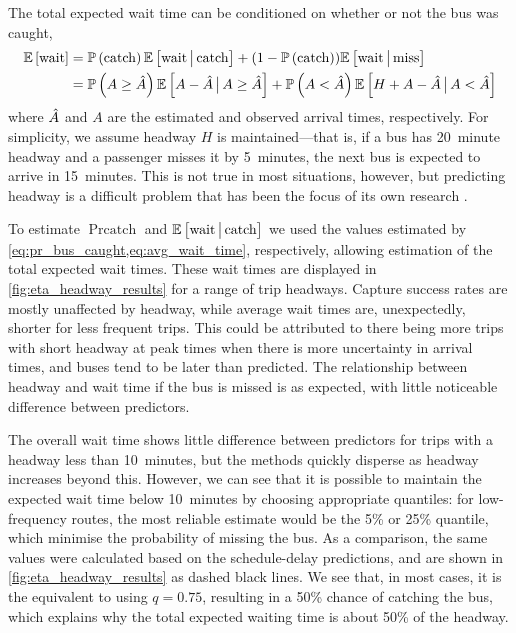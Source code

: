 The total expected wait time can be conditioned on whether or not the bus was caught,
\begin{equation}
\label{eq:eta_wait_conditional}
\begin{split}
\mathbb{E}\left[\text{wait}\right] &=
  \mathbb{P}\left(\text{catch}\right) \mathbb{E}\left[\text{wait}\,\big|\,{}\text{catch}\right] +
  (1 - \mathbb{P}\left(\text{catch}\right)) \mathbb{E}\left[\text{wait}\,\big|\,{}\text{miss}\right] \\
  &= \mathbb{P}\left(A \geq \hat{A}\right) \mathbb{E}\left[A - \hat{A} \,\big|\,{} A \geq \hat{A}\right] +
  \mathbb{P}\left(A < \hat{A}\right)\mathbb{E}\left[H + A - \hat{A} \,\big|\,{} A < \hat{A}\right]
\end{split}
\end{equation}
where $\hat{A}$ and $A$ are the estimated and observed arrival times, respectively. For simplicity, we assume headway $H$ is maintained---that is, if a bus has 20~minute headway and a passenger misses it by 5~minutes, the next bus is expected to arrive in 15~minutes. This is not true in most situations, however, but predicting headway is a difficult problem that has been the focus of its own research \citep{Chen_2012,Hans_2014,Hans_2015}.


To estimate $\Pr{\text{catch}}$ and $\mathbb{E}\left[\text{wait}\,\big|\,{}\text{catch}\right]$ we used the values estimated by \cref{eq:pr_bus_caught,eq:avg_wait_time}, respectively, allowing estimation of the total expected wait times. These wait times are displayed in \cref{fig:eta_headway_results} for a range of trip headways. Capture success rates are mostly unaffected by headway, while average wait times are, unexpectedly, shorter for less frequent trips. This could be attributed to there being more trips with short headway at peak times when there is more uncertainty in arrival times, and buses tend to be later than predicted. The relationship between headway and wait time if the bus is missed is as expected, with little noticeable difference between predictors.


The overall wait time shows little difference between predictors for trips with a headway less than 10~minutes, but the methods quickly disperse as headway increases beyond this. However, we can see that it is possible to maintain the expected wait time below 10~minutes by choosing appropriate quantiles: for low-frequency routes, the most reliable estimate would be the 5\% or 25\% quantile, which minimise the probability of missing the bus. As a comparison, the same values were calculated based on the schedule-delay predictions, and are shown in \cref{fig:eta_headway_results} as dashed black lines. We see that, in most cases, it is the equivalent to using $q=0.75$, resulting in a 50\% chance of catching the bus, which explains why the total expected waiting time is about 50\% of the headway.


